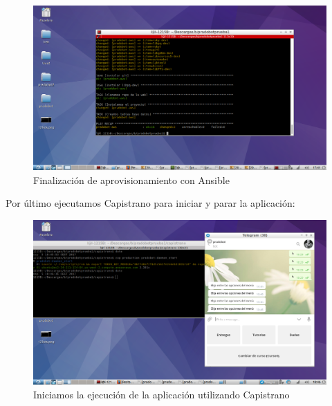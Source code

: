 \begin{figure}[H] %
\centering
\includegraphics[scale=0.3]{imagenes/random/2017-09-05-174148_1366x768_scrot.png}  %

\caption{Finalización de aprovisionamiento con Ansible}\label{figura94}

\end{figure}

Por último ejecutamos Capistrano para iniciar y parar la aplicación:

\begin{figure}[H] %
\centering
\includegraphics[scale=0.3]{imagenes/random/2017-09-05-184638_1366x768_scrot.png}  %

\caption{Iniciamos la ejecución de la aplicación utilizando Capistrano}\label{figura905}

\end{figure}


